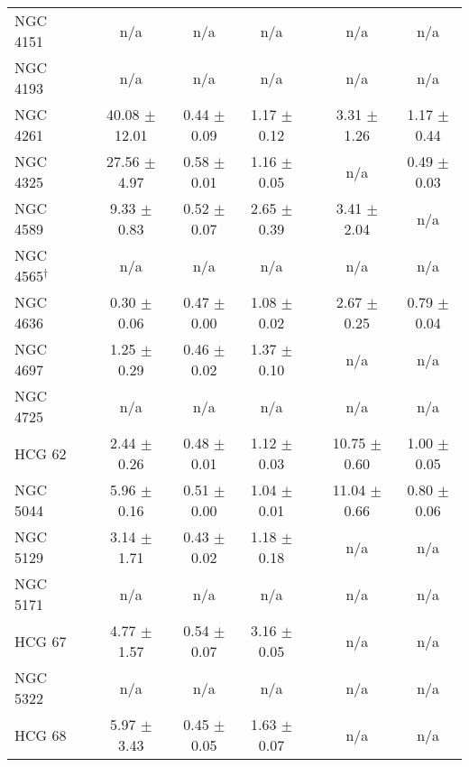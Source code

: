 \begin{table*}
\begin{center}
\begin{tabular}{@{}l@{}c@{\hspace{0.6cm}}ccc@{}c@{\hspace{0.6cm}}cc@{}}
NGC 4151              & &  n/a               &  n/a              &  n/a              & &  n/a               &  n/a              \\
NGC 4193              & &  n/a               &  n/a              &  n/a              & &  n/a               &  n/a              \\
NGC 4261              & &  40.08 $\pm$ 12.01 &  0.44 $\pm$ 0.09  &  1.17 $\pm$ 0.12  & &  3.31  $\pm$ 1.26  &  1.17 $\pm$ 0.44  \\
NGC 4325              & &  27.56 $\pm$ 4.97  &  0.58 $\pm$ 0.01  &  1.16 $\pm$ 0.05  & &  n/a               &  0.49 $\pm$ 0.03  \\
NGC 4589              & &  9.33  $\pm$ 0.83  &  0.52 $\pm$ 0.07  &  2.65 $\pm$ 0.39  & &  3.41  $\pm$ 2.04  &  n/a              \\
NGC 4565$^{\dagger}$  & &  n/a               &  n/a              &  n/a              & &  n/a               &  n/a              \\
NGC 4636              & &  0.30  $\pm$ 0.06  &  0.47 $\pm$ 0.00  &  1.08 $\pm$ 0.02  & &  2.67  $\pm$ 0.25  &  0.79 $\pm$ 0.04  \\
NGC 4697              & &  1.25  $\pm$ 0.29  &  0.46 $\pm$ 0.02  &  1.37 $\pm$ 0.10  & &  n/a               &  n/a              \\
NGC 4725              & &  n/a               &  n/a              &  n/a              & &  n/a               &  n/a              \\
HCG 62                & &  2.44  $\pm$ 0.26  &  0.48 $\pm$ 0.01  &  1.12 $\pm$ 0.03  & &  10.75 $\pm$ 0.60  &  1.00 $\pm$ 0.05  \\
NGC 5044              & &  5.96  $\pm$ 0.16  &  0.51 $\pm$ 0.00  &  1.04 $\pm$ 0.01  & &  11.04 $\pm$ 0.66  &  0.80 $\pm$ 0.06  \\
NGC 5129              & &  3.14  $\pm$ 1.71  &  0.43 $\pm$ 0.02  &  1.18 $\pm$ 0.18  & &  n/a               &  n/a              \\
NGC 5171              & &  n/a               &  n/a              &  n/a              & &  n/a               &  n/a              \\
HCG 67                & &  4.77  $\pm$ 1.57  &  0.54 $\pm$ 0.07  &  3.16 $\pm$ 0.05  & &  n/a               &  n/a              \\
NGC 5322              & &  n/a               &  n/a              &  n/a              & &  n/a               &  n/a              \\
HCG 68                & &  5.97  $\pm$ 3.43  &  0.45 $\pm$ 0.05  &  1.63 $\pm$ 0.07  & &  n/a               &  n/a              \\

\end{tabular}
\end{center}
\end{table*}
